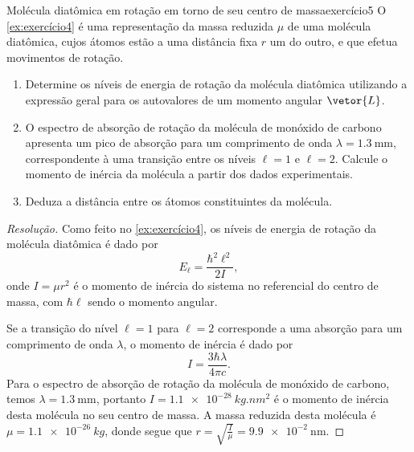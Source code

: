 \begin{exercício}{Molécula diatômica em rotação em torno de seu centro de massa}{exercício5}
    O \cref{ex:exercício4} é uma representação da massa reduzida \(\mu\) de uma molécula diatômica, cujos átomos estão a uma distância fixa \(r\) um do outro, e que efetua movimentos de rotação.
    \begin{enumerate}[label=(\alph*)]
        \item Determine os níveis de energia de rotação da molécula diatômica utilizando a expressão geral para os autovalores de um momento angular \(\vetor{L}\).
        \item O espectro de absorção de rotação da molécula de monóxido de carbono apresenta um pico de absorção para um comprimento de onda \(\lambda = \SI{1.3}{\milli\meter}\), correspondente à uma transição entre os níveis \(\ell = 1\) e \(\ell = 2\). Calcule o momento de inércia da molécula a partir dos dados experimentais.
        \item Deduza a distância entre os átomos constituintes da molécula.
    \end{enumerate}
\end{exercício}
\begin{proof}[Resolução]
    Como feito no \cref{ex:exercício4}, os níveis de energia de rotação da molécula diatômica é dado por
    \begin{equation*}
        E_\ell = \frac{\hbar^2 \ell^2}{2I},
    \end{equation*}
    onde \(I = \mu r^2\) é o momento de inércia do sistema no referencial do centro de massa, com \(\hbar \ell\) sendo o momento angular.

    Se a transição do nível \(\ell = 1\) para \(\ell = 2\) corresponde a uma absorção para um comprimento de onda \(\lambda\), o momento de inércia é dado por
    \begin{equation*}
        I = \frac{3\hbar \lambda}{4\pi c}.
    \end{equation*}
    Para o espectro de absorção de rotação da molécula de monóxido de carbono, temos \(\lambda = \SI{1.3}{\milli\meter}\), portanto \(I = \SI{1.1e-28}{kg.nm^2}\) é o momento de inércia desta molécula no seu centro de massa. A massa reduzida desta molécula é \(\mu = \SI{1.1e-26}{kg}\), donde segue que \(r = \sqrt{\frac{I}{\mu}} = \SI{9.9e-2}{\nano\meter}\).
\end{proof}
